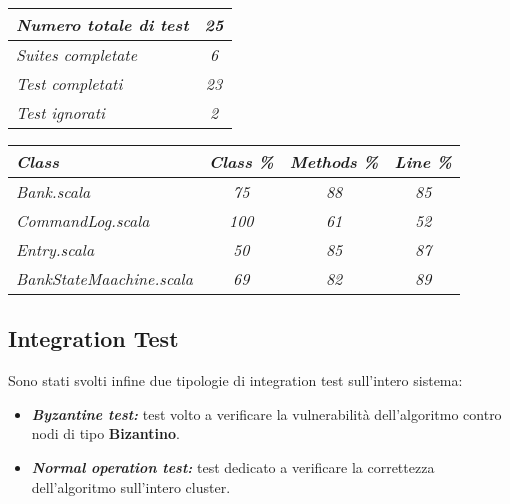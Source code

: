   \begin{center}
    \begin{tcolorbox}[title=\em{Risultati Test},hbox,    %
       lifted shadow={1mm}{-2mm}{3mm}{0.1mm}%
       {black!50!white}]
        \begin{tabular}{ |lc|}
          \hline
          \emph{Numero totale di test}  & \em{25}\\ 
          \hline
          \emph{Suites completate}      & \em{6}\\ 
          \hline
          \em{Test completati}          & \em{23}\\
          \hline
          \em{Test ignorati}            & \em{2}\\  
          \hline
        \end{tabular}
      \end{tcolorbox}
  \end{center}

  \begin{center}
    \begin{tcolorbox}[title=\em{Coverage},hbox,    %
       lifted shadow={1mm}{-2mm}{3mm}{0.1mm}%
       {black!50!white}]
        \begin{tabular}{ |lccc|}
        \hline
          \em{\textbf{Class}}           & \em{\textbf{Class \%}}  & \em{\textbf{Methods \%}}  & \em{\textbf{Line \%}} \\ 
          \hline
          \emph{Bank.scala}             & \em{75}                & \em{88}                  & \em{85}                 \\ 
          \hline
          \emph{CommandLog.scala}       & \em{100}               & \em{61}                  & \em{52}                 \\
          \hline
          \em{Entry.scala}              & \em{50}                & \em{85}                  & \em{87}                 \\
          \hline
          \em{BankStateMaachine.scala}  & \em{69}                & \em{82}                  & \em{89}                 \\
          \hline
        \end{tabular}
      \end{tcolorbox}
  \end{center}

  \subsection{Integration Test}
  Sono stati svolti infine due tipologie di integration test sull'intero sistema: 
  \begin{itemize}
    \item{\textbf{\emph{Byzantine test:}}}
    test volto a verificare la vulnerabilità dell'algoritmo contro nodi di tipo \textbf{Bizantino}.   
    \item{\textbf{\emph{Normal operation test:}}}
    test dedicato a verificare la correttezza dell'algoritmo sull'intero cluster.
  \end{itemize}